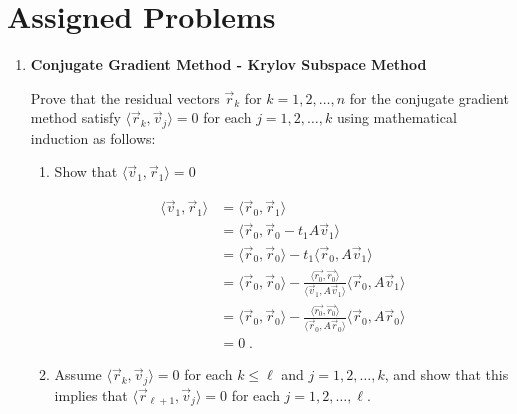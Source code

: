 \documentclass[a4paper]{article}
\begin{document}
\section*{Assigned Problems}
\begin{enumerate}
\item{\textbf{Conjugate Gradient Method - Krylov Subspace Method}}

Prove that the residual vectors $\vec{r}_k$ for $k=1,2,\ldots,n$ for the conjugate gradient method satisfy $\langle\vec{r}_k,\vec{v}_j\rangle=0$ for each $j=1,2,\ldots,k$ using mathematical induction as follows:
\begin{enumerate}
	\item 
	Show that $\langle \vec{v}_1, \vec{r}_1\rangle=0$
	
	\begin{align*}
	\langle \vec{v}_1,  \vec{r}_1\rangle & = 
	\langle \vec{r}_0, \vec{r}_1\rangle \\
	&= \langle \vec{r}_0, \vec{r}_0 - t_1A\vec{v}_1 \rangle \\
	&= \langle \vec{r}_0, \vec{r}_0 \rangle
	- t_1\langle \vec{r}_0, A\vec{v}_1\rangle \\
	&= \langle \vec{r}_0, \vec{r}_0 \rangle
	-\frac{\langle \vec{r_0}, \vec{r_0} \rangle}
	{\langle \vec{v}_1, A\vec{v}_1 \rangle}
	\langle  \vec{r}_0, A\vec{v}_1\rangle \\
	&= \langle \vec{r}_0, \vec{r}_0 \rangle
	-\frac{\langle \vec{r_0}, \vec{r_0} \rangle}
	{\langle \vec{r}_0, A\vec{r}_0 \rangle}
	\langle \vec{r}_0, A\vec{r}_0\rangle \\
	&= 0 \;.
	\end{align*}
		
	\item 
	Assume $\langle\vec{r}_k,\vec{v}_j\rangle=0$ for each 
	$k\leq\ell$ and $j=1,2,\ldots,k$, and show that this implies
	that $\langle\vec{r}_{\ell+1},\vec{v}_j\rangle=0$ for each 
	$j=1,2,\ldots,\ell$.
	

\end{enumerate}
\end{enumerate}
\end{document}
